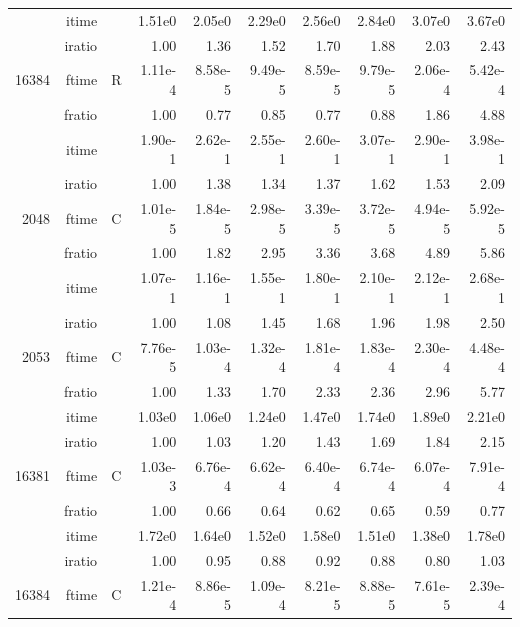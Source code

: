 \documentclass[a4paper]{article}
\begin{document}
\begin{table}[!htbp]
\begin{center}
\begin{small}
\begin{tabular}{|r|r|r|r|r|r|r|r|r|r|}
     & itime & &  1.51e0 &   2.05e0 &   2.29e0 &   2.56e0 &   2.84e0 &   3.07e0 &   3.67e0     \\ 
     & iratio & &  1.00 &   1.36 &   1.52 &   1.70 &   1.88 &   2.03 &   2.43     \\ \hline 
 16384  & ftime & R & 1.11e-4 &   8.58e-5 &   9.49e-5 &   8.59e-5 &   9.79e-5 &   2.06e-4 &   5.42e-4   \\ 
      & fratio & & 1.00 &   0.77 &   0.85 &   0.77 &   0.88 &   1.86 &   4.88  \\
     & itime & & 1.90e-1 &   2.62e-1 &   2.55e-1 &   2.60e-1 &   3.07e-1 &   2.90e-1 &   3.98e-1   \\ 
 & iratio & & 1.00 &   1.38 &   1.34 &   1.37 &   1.62 &   1.53 &   2.09   \\  \hline \hline
    2048  & ftime & C  &  1.01e-5 &   1.84e-5 &   2.98e-5 &   3.39e-5 &   3.72e-5 &   4.94e-5 &   5.92e-5   \\ 
      & fratio & &  1.00 &   1.82 &   2.95 &   3.36 &   3.68 &   4.89 &   5.86  \\ 
     & itime & &   1.07e-1 &   1.16e-1 &   1.55e-1 &   1.80e-1 &   2.10e-1 &   2.12e-1 &   2.68e-1   \\ 
     & iratio & &  1.00 &   1.08 &   1.45 &   1.68 &   1.96 &   1.98 &   2.50     \\ \hline 
    2053  & ftime & C &  7.76e-5 &   1.03e-4 &   1.32e-4 &   1.81e-4 &   1.83e-4 &   2.30e-4 &   4.48e-4     \\ 
      & fratio & &  1.00 &   1.33 &   1.70 &   2.33 &   2.36 &   2.96 &   5.77   \\ 
     & itime &  &  1.03e0 &   1.06e0 &   1.24e0 &   1.47e0 &   1.74e0 &   1.89e0 &   2.21e0    \\ 
    & iratio &  &  1.00 &   1.03 &   1.20 &   1.43 &   1.69 &   1.84 &   2.15       \\ \hline
  16381  & ftime & C &   1.03e-3 &   6.76e-4 &   6.62e-4 &   6.40e-4 &   6.74e-4 &   6.07e-4 &   7.91e-4     \\ 
      & fratio & &  1.00 &   0.66 &  0.64 &   0.62 &  0.65 &   0.59 &  0.77   \\ 
     & itime & &   1.72e0 &   1.64e0 &   1.52e0 &   1.58e0 &   1.51e0 &   1.38e0 &   1.78e0    \\ 
     & iratio & &   1.00 &   0.95 &  0.88 &  0.92 &  0.88 &  0.80 &  1.03    \\ \hline
 16384  & ftime & C &  1.21e-4 &   8.86e-5 &   1.09e-4 &   8.21e-5 &   8.88e-5 &   7.61e-5 &   2.39e-4  \\ 

\end{tabular}
\end{small}
\end{center}
\end{table}
\end{document}
